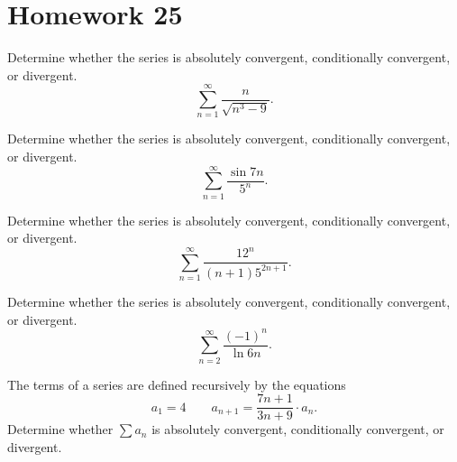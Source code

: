 \section*{Homework 25}
\begin{problem}[WebAssign HW 25, \# 1]
Determine whether the series is absolutely convergent, conditionally
convergent, or divergent.
\[
\sum_{n=1}^\infty\frac{n}{\sqrt{n^3-9}}.
\]
\end{problem}
\begin{problem}[WebAssign HW 25, \# 2]
Determine whether the series is absolutely convergent, conditionally
convergent, or divergent.
\[
\sum_{n=1}^\infty\frac{\sin 7n}{5^n}.
\]
\end{problem}
\begin{problem}[WebAssign HW 25, \# 3]
Determine whether the series is absolutely convergent, conditionally
convergent, or divergent.
\[
\sum_{n=1}^\infty\frac{12^n}{(n+1) 5^{2n+1}}.
\]
\end{problem}
\begin{problem}[WebAssign HW 25, \# 4]
Determine whether the series is absolutely convergent, conditionally
convergent, or divergent.
\[
\sum_{n=2}^\infty\frac{(-1)^n}{\ln 6n}.
\]
\end{problem}
\begin{problem}[WebAssign HW 25, \# 5]
The terms of a series are defined recursively by the equations
\[
a_1=4\qquad a_{n+1}=\frac{7n+1}{3n+9}\cdot a_n.
\]
Determine whether $\sum a_n$ is absolutely convergent, conditionally
convergent, or divergent.
\end{problem}

